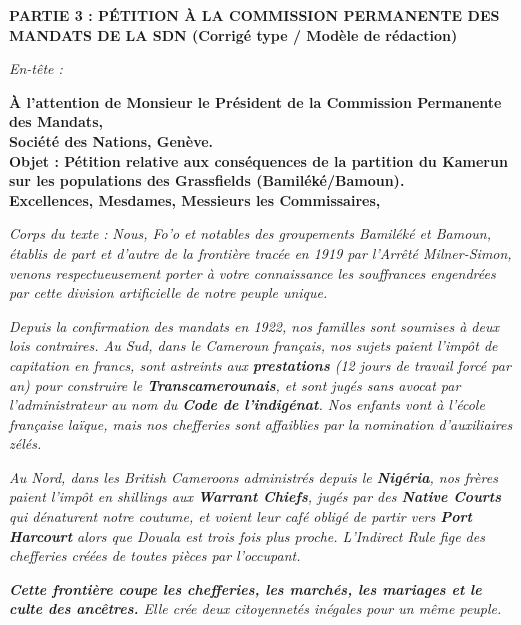 \documentclass[11pt]{article}
\begin{document}
\begin{exoresolu}
\medskip
\noindent \textbf{PARTIE 3 : PÉTITION À LA COMMISSION PERMANENTE DES MANDATS DE LA SDN (Corrigé type / Modèle de rédaction)}

\medskip
\noindent \textit{En-tête :}
\begin{flushleft}
\textbf{À l'attention de Monsieur le Président de la Commission Permanente des Mandats,}\\
\textbf{Société des Nations, Genève.}\\[0.5cm]
\textbf{Objet : Pétition relative aux conséquences de la partition du Kamerun sur les populations des Grassfields (Bamiléké/Bamoun).}\\[0.5cm]
\textbf{Excellences, Mesdames, Messieurs les Commissaires,}
\end{flushleft}

\noindent \textit{Corps du texte :}
\emph{Nous, Fo'o et notables des groupements Bamiléké et Bamoun, établis de part et d'autre de la frontière tracée en 1919 par l'Arrêté Milner-Simon, venons respectueusement porter à votre connaissance les souffrances engendrées par cette division artificielle de notre peuple unique.}

\emph{Depuis la confirmation des mandats en 1922, nos familles sont soumises à deux lois contraires. Au Sud, dans le Cameroun français, nos sujets paient l'impôt de capitation en francs, sont astreints aux \textbf{prestations} (12 jours de travail forcé par an) pour construire le \textbf{Transcamerounais}, et sont jugés sans avocat par l'administrateur au nom du \textbf{Code de l'indigénat}. Nos enfants vont à l'école française laïque, mais nos chefferies sont affaiblies par la nomination d'auxiliaires zélés.}

\emph{Au Nord, dans les British Cameroons administrés depuis le \textbf{Nigéria}, nos frères paient l'impôt en shillings aux \textbf{Warrant Chiefs}, jugés par des \textbf{Native Courts} qui dénaturent notre coutume, et voient leur café obligé de partir vers \textbf{Port Harcourt} alors que Douala est trois fois plus proche. L'\emph{Indirect Rule} fige des chefferies créées de toutes pièces par l'occupant.}

\emph{\textbf{Cette frontière coupe les chefferies, les marchés, les mariages et le culte des ancêtres.} Elle crée deux citoyennetés inégales pour un même peuple.}


\end{exoresolu}
\end{document}
